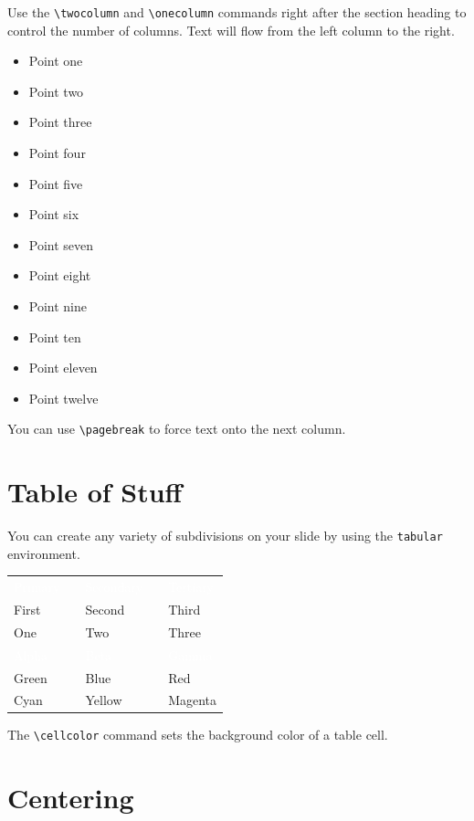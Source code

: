 \documentclass{antclass}
\begin{document}
Use the \verb|\twocolumn| and \verb|\onecolumn| commands right after the section
heading to control the number of columns. Text will flow from the left column to
the right.
\begin{itemize}
    \item Point one
    \item Point two
    \item Point three
    \item Point four
    \item Point five
    \item Point six
    \item Point seven
    \item Point eight
    \item Point nine
    \item Point ten
    \item Point eleven
    \item Point twelve
\end{itemize}
You can use \verb|\pagebreak| to force text onto the next column.

\section{Table of Stuff}

You can create any variety of subdivisions on your slide by using the
\verb|tabular| environment.
\begin{center}
\begin{tabular}{C{0.25\textwidth}cC{0.25\textwidth}cC{0.25\textwidth}}
    \textcolor{white}{Primary}\strut &&
    \textcolor{white}{Secondary}\strut &&
    \textcolor{white}{Tertiary}\strut \\
    First && Second && Third \\
    One && Two && Three \\[1em]
    \textcolor{white}{Alpha}\strut &&
    \textcolor{white}{Beta}\strut &&
    \textcolor{white}{Gamma}\strut \\
    Green && Blue && Red \\
    Cyan && Yellow && Magenta
\end{tabular}
\end{center}
The \verb|\cellcolor| command sets the background color of a table cell.

\section{Centering}
\end{document}
